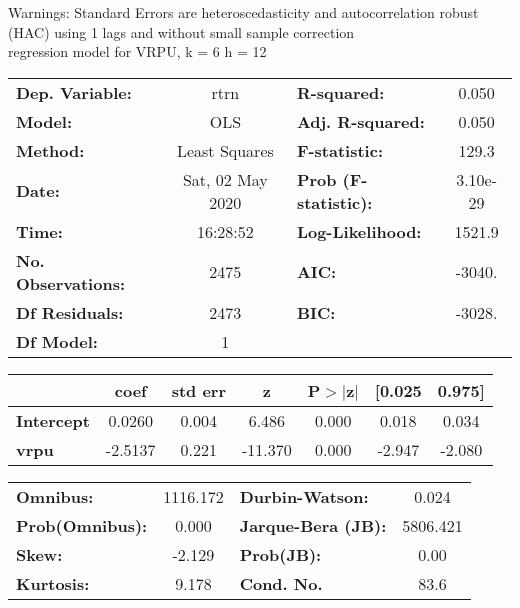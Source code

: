Warnings: \newline
 [1] Standard Errors are heteroscedasticity and autocorrelation robust (HAC) using 1 lags and without small sample correction\\ 

regression model for VRPU, k = 6 h = 12\begin{center}
\begin{tabular}{lclc}
\toprule
\textbf{Dep. Variable:}    &       rtrn       & \textbf{  R-squared:         } &     0.050   \\
\textbf{Model:}            &       OLS        & \textbf{  Adj. R-squared:    } &     0.050   \\
\textbf{Method:}           &  Least Squares   & \textbf{  F-statistic:       } &     129.3   \\
\textbf{Date:}             & Sat, 02 May 2020 & \textbf{  Prob (F-statistic):} &  3.10e-29   \\
\textbf{Time:}             &     16:28:52     & \textbf{  Log-Likelihood:    } &    1521.9   \\
\textbf{No. Observations:} &        2475      & \textbf{  AIC:               } &    -3040.   \\
\textbf{Df Residuals:}     &        2473      & \textbf{  BIC:               } &    -3028.   \\
\textbf{Df Model:}         &           1      & \textbf{                     } &             \\
\bottomrule
\end{tabular}
\begin{tabular}{lcccccc}
                   & \textbf{coef} & \textbf{std err} & \textbf{z} & \textbf{P$> |$z$|$} & \textbf{[0.025} & \textbf{0.975]}  \\
\midrule
\textbf{Intercept} &       0.0260  &        0.004     &     6.486  &         0.000        &        0.018    &        0.034     \\
\textbf{vrpu}      &      -2.5137  &        0.221     &   -11.370  &         0.000        &       -2.947    &       -2.080     \\
\bottomrule
\end{tabular}
\begin{tabular}{lclc}
\textbf{Omnibus:}       & 1116.172 & \textbf{  Durbin-Watson:     } &    0.024  \\
\textbf{Prob(Omnibus):} &   0.000  & \textbf{  Jarque-Bera (JB):  } & 5806.421  \\
\textbf{Skew:}          &  -2.129  & \textbf{  Prob(JB):          } &     0.00  \\
\textbf{Kurtosis:}      &   9.178  & \textbf{  Cond. No.          } &     83.6  \\
\bottomrule
\end{tabular}
\end{center}


